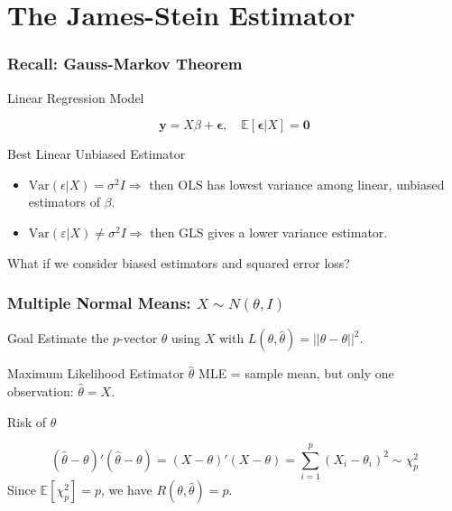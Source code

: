 \section{The James-Stein Estimator}
\begin{frame}
  \frametitle{Recall: Gauss-Markov Theorem}
  \begin{block}{Linear Regression Model}
    
    $$\mathbf{y} = X\beta + \boldsymbol{\epsilon}, \quad \mathbb{E}[\boldsymbol{\epsilon}|X] = \mathbf{0}$$
  \end{block}


  \begin{block}{Best Linear Unbiased Estimator}
    
    \begin{itemize}
      \item $\mbox{Var}(\epsilon|X) = \sigma^2 I \Rightarrow$ then OLS has lowest variance among linear, unbiased estimators of $\beta$.
      \item  $\mbox{Var}(\varepsilon|X)\neq \sigma^2 I \Rightarrow$ then GLS gives a lower variance estimator.  
    \end{itemize}
  \end{block}

  \begin{alertblock}{What if we consider biased estimators and squared error loss?}
    
  \end{alertblock}
    
\end{frame}
\begin{frame}
  \frametitle{Multiple Normal Means: $X \sim N(\theta, I)$}

  \begin{block}{Goal}
    Estimate the $p$-vector $\theta$ using $X$ with $L(\theta, \widehat{\theta}) = \lvert\lvert \widehat{\theta} - \theta\rvert\rvert^2$.
  \end{block}

  \begin{block}{Maximum Likelihood Estimator $\widehat{\theta}$}
MLE = sample mean, but only one observation: $\hat{\theta} = X$.
  \end{block}

  \begin{block}{Risk of $\widehat{\theta}$}
    
    \vspace{-1em}
\begin{equation*}
  \left( \hat{\theta} - \theta \right)' \left( \hat{\theta}- \theta \right) = \left( X - \theta \right)'\left( X-\theta \right)= \sum_{i = 1}^{p} \left( X_{i} - \theta_i \right)^2 \sim \chi^2_p 
\end{equation*}
Since $\mathbb{E}[\chi^2_p]=p$, we have $R(\theta, \hat{\theta})=p$.
  \end{block}

\end{frame}
